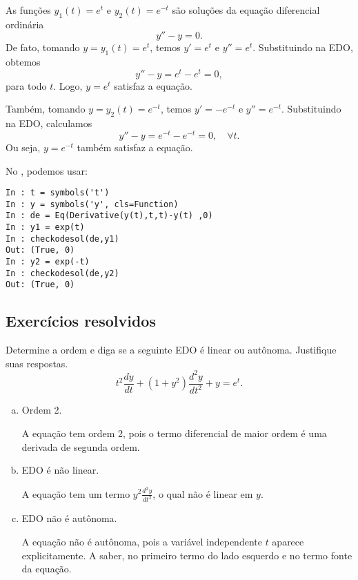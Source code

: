 \begin{ex}
  As funções $y_1(t) = e^t$ e $y_2(t) = e^{-t}$ são soluções da equação diferencial ordinária
  \begin{equation}
    y'' - y = 0.
  \end{equation}
  De fato, tomando $y = y_1(t) = e^t$, temos $y' = e^t$ e $y'' = e^t$. Substituindo na EDO, obtemos
  \begin{equation}
    y'' - y = e^t - e^t = 0,
  \end{equation}
  para todo $t$. Logo, $y = e^t$ satisfaz a equação.
  
  Também, tomando $y = y_2(t) = e^{-t}$, temos $y' = -e^{-t}$ e $y'' = e^{-t}$. Substituindo na EDO, calculamos
  \begin{equation}
    y'' - y = e^{-t} - e^{-t} = 0, \quad\forall t.
  \end{equation}
  Ou seja, $y = e^{-t}$ também satisfaz a equação.

  \ifispython
  No \python, podemos usar:
\begin{verbatim}
In : t = symbols('t')
In : y = symbols('y', cls=Function)
In : de = Eq(Derivative(y(t),t,t)-y(t) ,0)
In : y1 = exp(t)
In : checkodesol(de,y1)
Out: (True, 0)
In : y2 = exp(-t)
In : checkodesol(de,y2)
Out: (True, 0)
\end{verbatim}
  \fi
\end{ex}

\subsection*{Exercícios resolvidos}

\begin{exeresol}
  Determine a ordem e diga se a seguinte EDO é linear ou autônoma. Justifique suas respostas.
  \begin{equation}
    t^2\frac{dy}{dt} + (1+y^2)\frac{d^2y}{dt^2} + y = e^t.
  \end{equation}
\end{exeresol}
\begin{resol}
  \begin{enumerate}[a)]
  \item Ordem 2.

    A equação tem ordem 2, pois o termo diferencial de maior ordem é uma derivada de segunda ordem.

  \item EDO é não linear.

    A equação tem um termo $\displaystyle y^2\frac{d^2y}{dt^2}$, o qual não é linear em $y$.

  \item EDO não é autônoma.

    A equação não é autônoma, pois a variável independente $t$ aparece explicitamente. A saber, no primeiro termo do lado esquerdo e no termo fonte da equação.
  \end{enumerate}
\end{resol}

